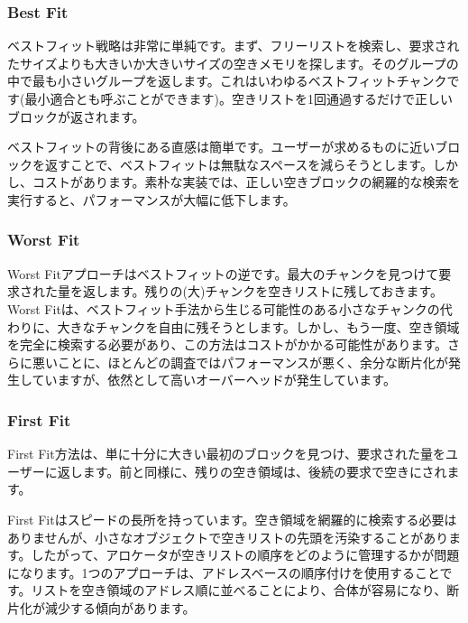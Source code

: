 \hypertarget{best-fit}{%
\subsubsection*{Best Fit}\label{best-fit}}

ベストフィット戦略は非常に単純です。まず、フリーリストを検索し、要求されたサイズよりも大きいか大きいサイズの空きメモリを探します。そのグループの中で最も小さいグループを返します。これはいわゆるベストフィットチャンクです(最小適合とも呼ぶことができます)。空きリストを1回通過するだけで正しいブロックが返されます。

ベストフィットの背後にある直感は簡単です。ユーザーが求めるものに近いブロックを返すことで、ベストフィットは無駄なスペースを減らそうとします。しかし、コストがあります。素朴な実装では、正しい空きブロックの網羅的な検索を実行すると、パフォーマンスが大幅に低下します。

\hypertarget{worst-fit}{%
\subsubsection*{Worst Fit}\label{worst-fit}}

Worst
Fitアプローチはベストフィットの逆です。最大のチャンクを見つけて要求された量を返します。残りの(大)チャンクを空きリストに残しておきます。Worst
Fitは、ベストフィット手法から生じる可能性のある小さなチャンクの代わりに、大きなチャンクを自由に残そうとします。しかし、もう一度、空き領域を完全に検索する必要があり、この方法はコストがかかる可能性があります。さらに悪いことに、ほとんどの調査ではパフォーマンスが悪く、余分な断片化が発生していますが、依然として高いオーバーヘッドが発生しています。

\hypertarget{first-fit}{%
\subsubsection*{First Fit}\label{first-fit}}

First
Fit方法は、単に十分に大きい最初のブロックを見つけ、要求された量をユーザーに返します。前と同様に、残りの空き領域は、後続の要求で空きにされます。

First
Fitはスピードの長所を持っています。空き領域を網羅的に検索する必要はありませんが、小さなオブジェクトで空きリストの先頭を汚染することがあります。したがって、アロケータが空きリストの順序をどのように管理するかが問題になります。1つのアプローチは、アドレスベースの順序付けを使用することです。リストを空き領域のアドレス順に並べることにより、合体が容易になり、断片化が減少する傾向があります。

